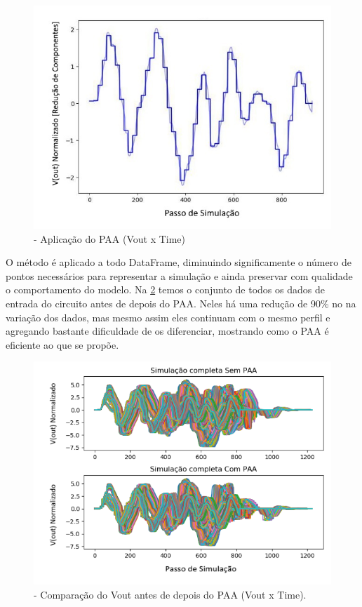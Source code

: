 \begin{figure}[H]
\begin{center}
\includegraphics[width=14cm]{./04_Cap4/figures/paa-simples.jpg}
\caption{\label{fig:PAASaplicacao}- Aplicação do PAA (Vout x Time)}
\end{center}
\end{figure}

O método é aplicado a todo DataFrame, diminuindo significamente o número de pontos necessários para representar a simulação e ainda preservar com qualidade o comportamento do modelo. Na \ref{fig:Analisepaa} temos o conjunto de todos os dados de entrada do circuito antes de depois do PAA. Neles há uma redução de 90\% no na variação dos dados, mas mesmo assim eles continuam com o mesmo perfil e agregando bastante dificuldade de os diferenciar, mostrando como o PAA é eficiente ao que se propõe. 

\begin{figure}[H]
\begin{center}
\includegraphics[width=15cm]{./04_Cap4/figures/dadosCompletos.png}
\caption{\label{fig:Analisepaa}- Comparação do Vout antes de depois do PAA (Vout x Time).}
\end{center}
\end{figure}


